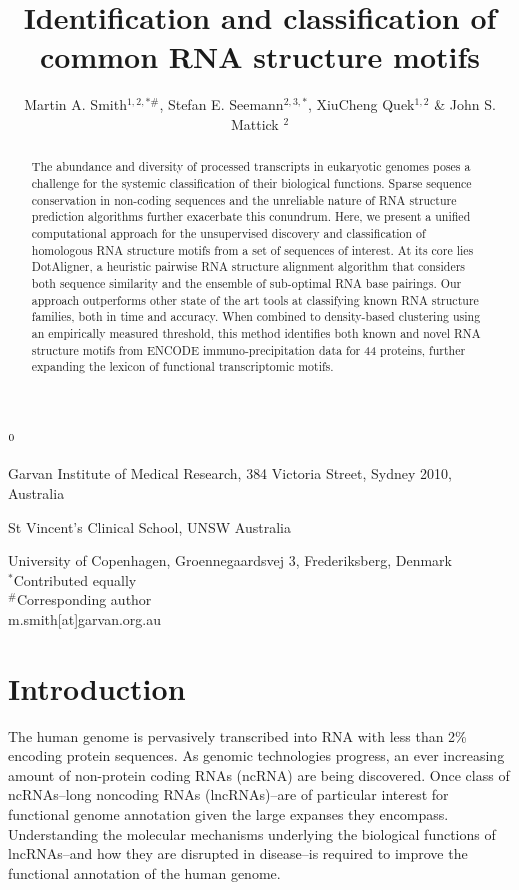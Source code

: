 \documentclass[a4paper,11pt]{article}
\title{Identification and classification of common RNA structure motifs }
\author{Martin A. Smith$^{1,2,*\#}$, Stefan E. Seemann$^{2,3,*}$, XiuCheng Quek$^{1,2}$ \& John S. Mattick $^2$}
\newenvironment{affiliations}{%
    \setcounter{enumi}{1}%
    \setlength{\parindent}{0in}%
    \slshape\sloppy%
    \begin{list}{\upshape$^{\arabic{enumi}}$}{%
        \usecounter{enumi}%
        \setlength{\leftmargin}{0in}%
        \setlength{\topsep}{0in}%
        \setlength{\labelsep}{0in}%
        \setlength{\labelwidth}{0in}%
        \setlength{\listparindent}{0in}%
        \setlength{\itemsep}{0ex}%
        \setlength{\parsep}{0in}%
        }
    }{\end{list}\par\vspace{12pt}}
\begin{document}
\maketitle

\begin{affiliations}
\item Garvan Institute of Medical Research, 384 Victoria Street, Sydney 2010, Australia
\item  St Vincent’s Clinical School, UNSW Australia
\item University of Copenhagen, Groennegaardsvej 3, Frederiksberg, Denmark\\
 $^*$Contributed equally\\
 $^\#$Corresponding author\\
 m.smith[at]garvan.org.au 
\end{affiliations}

\begin{abstract}
\noindent  The abundance  and diversity of processed transcripts in eukaryotic genomes poses a challenge 
for the systemic classification of their biological functions. Sparse sequence conservation in 
non-coding sequences and the unreliable nature of RNA structure prediction algorithms further 
exacerbate this conundrum. Here, we present a unified computational approach for the 
unsupervised discovery and classification of homologous RNA structure motifs from a set of 
sequences of interest.  At its core lies DotAligner, a heuristic pairwise RNA structure alignment 
algorithm that considers both sequence similarity and the ensemble of sub-optimal RNA base pairings.  
Our approach outperforms other state of the art tools at classifying known RNA structure families, 
both in time and accuracy. When combined to density-based clustering using an empirically measured 
threshold, this method identifies both known and novel RNA structure motifs from ENCODE 
immuno-precipitation data for 44 proteins, further expanding the lexicon of functional transcriptomic motifs. 
\end{abstract}

\section*{Introduction}
The human genome is pervasively transcribed into RNA with less than 2\%
encoding protein sequences. As genomic technologies progress, an ever 
increasing amount of non-protein coding RNAs (ncRNA) are being discovered.
Once class of ncRNAs--long noncoding RNAs (lncRNAs)--are of particular 
interest for functional genome annotation given the large expanses they encompass. 
Understanding the molecular mechanisms underlying the biological functions of 
lncRNAs--and how they are disrupted in disease--is required to improve 
the functional annotation of the human genome. \\
\end{document}
